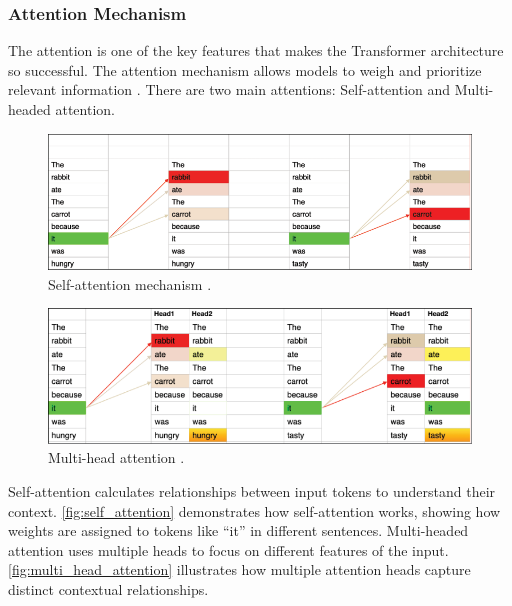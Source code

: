 \subsubsection*{Attention Mechanism}

The attention is one of the key features that makes the Transformer architecture so successful. The attention mechanism allows models to weigh and prioritize relevant information \cite{timsina2024building}. There are two main attentions: Self-attention and Multi-headed attention.

\begin{figure}[htbp]
    \centering
    \includegraphics[width=0.99\linewidth]{obrazky-figures/02-theoretical-basis/self-attention.png}
    \caption{Self-attention mechanism \cite{timsina2024building}.}
    \label{fig:self_attention}
\end{figure}

\begin{figure}[htbp]
    \centering
    \includegraphics[width=0.99\linewidth]{obrazky-figures/02-theoretical-basis/multi-head-attention.png}
    \caption{Multi-head attention \cite{timsina2024building}.}
    \label{fig:multi_head_attention}
\end{figure}

Self-attention calculates relationships between input tokens to understand their context. \autoref{fig:self_attention} demonstrates how self-attention works, showing how weights are assigned to tokens like \enquote{it} in different sentences. Multi-headed attention uses multiple heads to focus on different features of the input. \autoref{fig:multi_head_attention} illustrates how multiple attention heads capture distinct contextual relationships.

